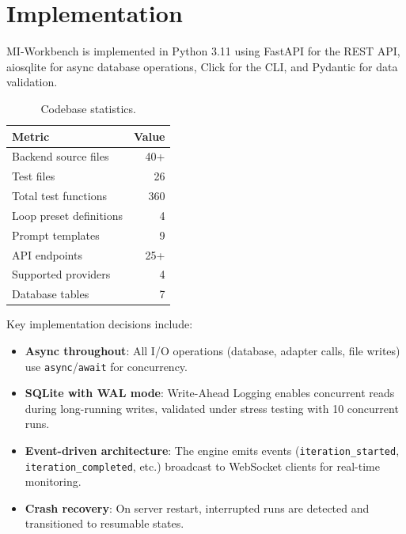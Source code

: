 \documentclass[10pt]{article}
\begin{document}

\section{Implementation}
\label{sec:implementation}

MI-Workbench is implemented in Python 3.11 using FastAPI for the REST API, aiosqlite for async database operations, Click for the CLI, and Pydantic for data validation.

\begin{table}[t]
\centering
\small
\caption{Codebase statistics.}
\label{tab:stats}
\begin{tabular}{@{}lr@{}}
\toprule
\textbf{Metric} & \textbf{Value} \\
\midrule
Backend source files & 40+ \\
Test files & 26 \\
Total test functions & 360 \\
Loop preset definitions & 4 \\
Prompt templates & 9 \\
API endpoints & 25+ \\
Supported providers & 4 \\
Database tables & 7 \\
\bottomrule
\end{tabular}
\end{table}

Key implementation decisions include:
\begin{itemize}
  \item \textbf{Async throughout}: All I/O operations (database, adapter calls, file writes) use \texttt{async}/\texttt{await} for concurrency.
  \item \textbf{SQLite with WAL mode}: Write-Ahead Logging enables concurrent reads during long-running writes, validated under stress testing with 10 concurrent runs.
  \item \textbf{Event-driven architecture}: The engine emits events (\texttt{iteration\_started}, \texttt{iteration\_completed}, etc.) broadcast to WebSocket clients for real-time monitoring.
  \item \textbf{Crash recovery}: On server restart, interrupted runs are detected and transitioned to resumable states.
\end{itemize}

\end{document}
